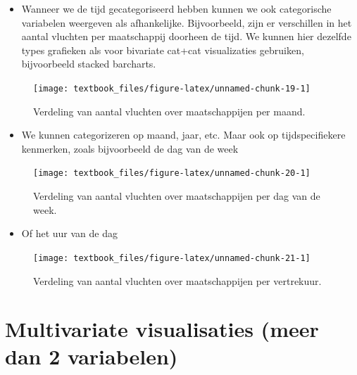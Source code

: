 \documentclass[]{tufte-book}
\providecommand{\tightlist}{%
  \setlength{\itemsep}{0pt}\setlength{\parskip}{0pt}}
\begin{document}
\begin{itemize}
\tightlist
\item
  Wanneer we de tijd gecategoriseerd hebben kunnen we ook categorische variabelen weergeven als afhankelijke. Bijvoorbeeld, zijn er verschillen in het aantal vluchten per maatschappij doorheen de tijd. We kunnen hier dezelfde types grafieken als voor bivariate cat+cat visualizaties gebruiken, bijvoorbeeld stacked barcharts.
\end{itemize}

\begin{figure}
\texttt{[image: textbook\_files/figure-latex/unnamed-chunk-19-1]} \caption[Verdeling van aantal vluchten over maatschappijen per maand]{Verdeling van aantal vluchten over maatschappijen per maand.}\label{fig:unnamed-chunk-19}
\end{figure}

\begin{itemize}
\tightlist
\item
  We kunnen categorizeren op maand, jaar, etc. Maar ook op tijdspecifiekere kenmerken, zoals bijvoorbeeld de dag van de week
\end{itemize}

\begin{figure}
\texttt{[image: textbook\_files/figure-latex/unnamed-chunk-20-1]} \caption[Verdeling van aantal vluchten over maatschappijen per dag van de week]{Verdeling van aantal vluchten over maatschappijen per dag van de week.}\label{fig:unnamed-chunk-20}
\end{figure}

\begin{itemize}
\tightlist
\item
  Of het uur van de dag
\end{itemize}

\begin{figure}
\texttt{[image: textbook\_files/figure-latex/unnamed-chunk-21-1]} \caption[Verdeling van aantal vluchten over maatschappijen per vertrekuur]{Verdeling van aantal vluchten over maatschappijen per vertrekuur.}\label{fig:unnamed-chunk-21}
\end{figure}

\hypertarget{multivariate-visualisaties-meer-dan-2-variabelen}{%
\section{Multivariate visualisaties (meer dan 2 variabelen)}\label{multivariate-visualisaties-meer-dan-2-variabelen}}
\end{document}
